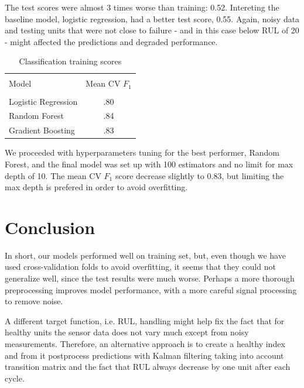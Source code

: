\documentclass[letterpaper, 10 pt, conference, onecolumn]{ieeeconf}  %
\begin{document}
The test scores were almost 3 times worse than training: 0.52. Intereting the baseline model, logistic regression, had a better test score, 0.55. Again, noisy data and testing units that were not close to failure - and in this case below RUL of 20 - might affected the predictions and degraded performance.
\begin{table}[!h]
    \centering
    \begin{tabular}{l|c}
        \hline 
        \hline \\[-1.8ex] 
        Model & Mean CV $F_1$ \\
        \hline \\[-1.8ex] 
         Logistic Regression & .80 \\
         Random Forest & .84 \\
         Gradient Boosting & .83 \\
         \hline
         \hline
    \end{tabular}
    \caption{Classification training scores}
    \label{tab:clf-train-scores}
\end{table}

We proceeded with hyperparameters tuning for the best performer, Random Forest, and the final model was set up with 100 estimators and no limit for max depth of 10. The mean CV $F_1$ score decrease slightly to 0.83, but limiting the max depth is prefered in order to avoid overfitting. 



\section{Conclusion}\label{sec:conclusion}
In short, our models performed well on training set, but, even though we have used cross-validation folds to avoid overfitting, it seems that they could not generalize well, since the test results were much worse. Perhaps a more thorough preprocessing improves model performance, with a more careful signal processing to remove noise.

A different target function, i.e. RUL, handling might help fix the fact that for healthy units the sensor data does not vary much except from noisy measurements. Therefore, an alternative approach is to create a healthy index and from it postprocess predictions with Kalman filtering taking into account transition matrix and the fact that RUL always decrease by one unit after each cycle.

\newpage



\end{document}
